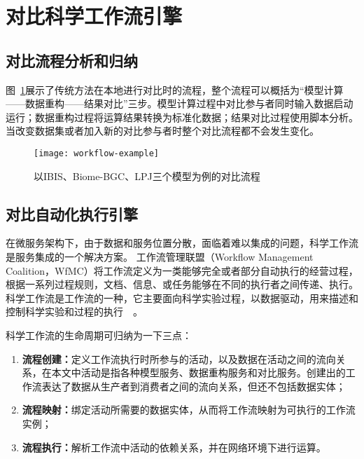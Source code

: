 \section{对比科学工作流引擎}
\subsection{对比流程分析和归纳}
图~\ref{fig:workflow-example}展示了传统方法在本地进行对比时的流程，整个流程可以概括为“模型计算——数据重构——结果对比”三步。模型计算过程中对比参与者同时输入数据启动运行；数据重构过程将运算结果转换为标准化数据；结果对比过程使用脚本分析。当改变数据集或者加入新的对比参与者时整个对比流程都不会发生变化。

\begin{figure}[!htbp]
    \centering
    \texttt{[image: workflow-example]}
    \caption{以IBIS、Biome-BGC、LPJ三个模型为例的对比流程}
    \label{fig:workflow-example}
\end{figure}

\subsection{对比自动化执行引擎}
在微服务架构下，由于数据和服务位置分散，面临着难以集成的问题，科学工作流是服务集成的一个解决方案。 %
工作流管理联盟（Workflow Management Coalition，WfMC）将工作流定义为一类能够完全或者部分自动执行的经营过程，根据一系列过程规则，文档、信息、或任务能够在不同的执行者之间传递、执行。科学工作流是工作流的一种，它主要面向科学实验过程，以数据驱动，用来描述和控制科学实验和过程的执行~\cite{ludascher2006scientific}~\cite{Zhao2009Special}。

科学工作流的生命周期可归纳为一下三点：
\begin{enumerate}[(1)]
    \item \textbf{流程创建：}定义工作流执行时所参与的活动，以及数据在活动之间的流向关系，在本文中活动是指各种模型服务、数据重构服务和对比服务。创建出的工作流表达了数据从生产者到消费者之间的流向关系，但还不包括数据实体；
    \item \textbf{流程映射：}绑定活动所需要的数据实体，从而将工作流映射为可执行的工作流实例；
    \item \textbf{流程执行：}解析工作流中活动的依赖关系，并在网络环境下进行运算。
\end{enumerate}

